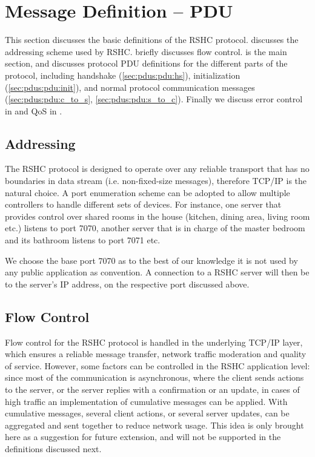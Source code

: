 \section{Message Definition -- PDU}
\label{sec:pdus}

This section discusses the basic definitions of the RSHC protocol.  discusses the addressing scheme used by RSHC.  briefly discusses flow control.  is the main section, and discusses protocol PDU definitions for the different parts of the protocol, including handshake (\ref{sec:pdus:pdu:hs}), initialization (\ref{sec:pdus:pdu:init}), and normal protocol communication messages (\ref{sec:pdus:pdu:c_to_s}, \ref{sec:pdus:pdu:s_to_c}). Finally we discuss error control in  and QoS in .

\subsection{Addressing}
\label{sec:pdus:addr}

The RSHC protocol is designed to operate over any reliable transport that has no boundaries in data stream (i.e. non-fixed-size messages), therefore TCP/IP is the natural choice. A port enumeration scheme can be adopted to allow multiple controllers to handle different sets of devices. For instance, one server that provides control over shared rooms in the house (kitchen, dining area, living room etc.) listens to port 7070, another server that is in charge of the master bedroom and its bathroom listens to port 7071 etc.

We choose the base port 7070 as to the best of our knowledge it is not used by any public application as convention. A connection to a RSHC server will then be to the server's IP address, on the respective port discussed above.

\subsection{Flow Control}
\label{sec:pdus:flow}

Flow control for the RSHC protocol is handled in the underlying TCP/IP layer, which ensures a reliable message transfer, network traffic moderation and quality of service. However, some factors can be controlled in the RSHC application level: since most of the communication is asynchronous, where the client sends actions to the server, or the server replies with a confirmation or an update, in cases of high traffic an implementation of cumulative messages can be applied. With cumulative messages, several client actions, or several server updates, can be aggregated and sent together to reduce network usage. This idea is only brought here as a suggestion for future extension, and will not be supported in the definitions discussed next.

